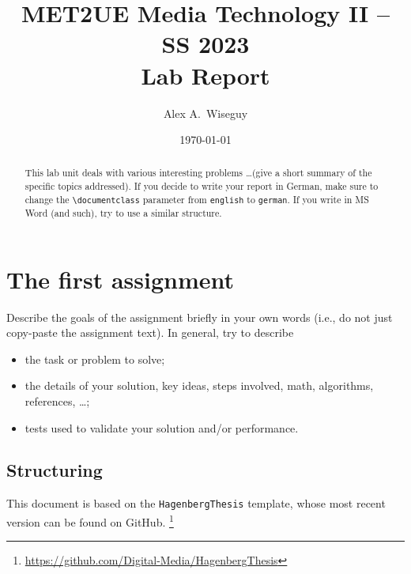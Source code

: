 \documentclass[english,notitlepage,smartquotes]{hgbreport}
\begin{document}

\author{Alex A.\ Wiseguy}                      %
\title{MET2UE Media Technology II -- SS 2023\\ %
				Lab Report }
\date{\today}

\maketitle

\begin{abstract}\noindent
This lab unit deals with various interesting problems \ldots (give a short
summary of the specific topics addressed). If you decide to write your report
in German, make sure to change the \verb!\documentclass! parameter from
\texttt{english} to \texttt{german}. If you write in MS Word (and such), try
to use a similar structure.
\end{abstract}


\section{The first assignment}

Describe the goals of the assignment briefly in your own words (i.e., do not
just copy-paste the assignment text). In general, try to describe
%
\begin{itemize}
	\item the task or problem to solve;
	\item the details of your solution, key ideas, steps involved, math,
	algorithms, references, \ldots;
	\item tests used to validate your solution and/or performance.
\end{itemize}

\subsection{Structuring} %

This \latex document is based on the \texttt{HagenbergThesis} template, whose
most recent version can be found on GitHub.%
\footnote{\url{https://github.com/Digital-Media/HagenbergThesis}}
\end{document}
